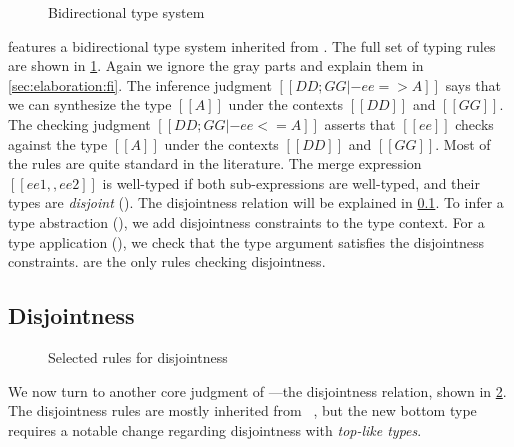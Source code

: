 \begin{figure}[t]
  \centering
  \caption{Bidirectional type system}
  \label{fig:typing:fi}
\end{figure}


\fnamee features a bidirectional type system inherited from \fname.
The full set of typing rules are shown in \cref{fig:typing:fi}. Again we ignore
the gray parts and explain them in \cref{sec:elaboration:fi}.
The inference judgment $[[ DD; GG |- ee => A ]]$ says
that we can synthesize the type $[[A]]$ under the contexts $[[DD]]$ and
$[[GG]]$. The checking judgment $[[ DD ; GG |- ee <= A ]]$ asserts that $[[ee]]$
checks against the type $[[A]]$ under the contexts $[[DD]]$ and $[[GG]]$.
Most of the rules are quite standard in the literature.
The merge expression $[[ee1 ,, ee2]]$ is well-typed if both sub-expressions are
well-typed, and their types are \textit{disjoint} ().
The disjointness relation will be explained in \cref{sec:disjoint:fi}.
To infer a type abstraction (), we add disjointness constraints to the type
context. For a type
application (), we check that the type argument
satisfies the disjointness constraints.
 are the only rules checking disjointness.


\subsection{Disjointness}
\label{sec:disjoint:fi}

\renewcommand{\rulehl}[1]{#1}

\begin{figure}[t]
  \centering
  \caption{Selected rules for disjointness}
  \label{fig:disjoint:fi}
\end{figure}

We now turn to another core judgment of \fnamee---the disjointness relation,
shown in \cref{fig:disjoint:fi}. The disjointness rules are mostly inherited
from \fname~\cite{alpuimdisjoint}, but the new bottom type requires
a notable change regarding disjointness with \emph{top-like types}.

